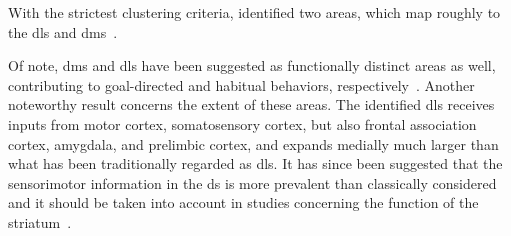 With the strictest clustering criteria, \citeauthor{Hunnicutt2016} identified two areas, which map roughly to the \gls{dls} and \gls{dms}\footnotemark~\cite{Hunnicutt2016}.

Of note, \gls{dms} and \gls{dls} have been suggested as functionally distinct areas as well, contributing to goal-directed and habitual behaviors, respectively~\cite{Yin2006NatRevNeurosci}.
Another noteworthy result concerns the extent of these areas.
The identified \gls{dls} receives inputs from motor cortex, somatosensory cortex, but also frontal association cortex, amygdala, and prelimbic cortex, and expands medially much larger than what has been traditionally regarded as \gls{dls}.
It has since been suggested that the sensorimotor information in the \gls{ds} is more prevalent than classically considered and it should be taken into account in studies concerning the function of the striatum~\cite{Robbe2018}.


